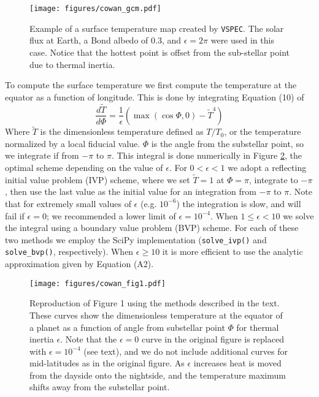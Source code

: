 \documentclass[twocolumn]{aastex631}
\newcommand{\vspec}[1]{\texttt{VSPEC}#1}
\begin{document}
\begin{figure}
    \centering
    \texttt{[image: figures/cowan\_gcm.pdf]}
    \caption{
        Example of a surface temperature map created by \vspec{}. The solar flux at Earth,
        a Bond albedo of 0.3, and $\epsilon = 2\pi$ were used in this case.
        Notice that the hottest point is offset from the sub-stellar point due to thermal inertia.
    }
    \label{fig:thermal_inertia}
\end{figure}

To compute the surface temperature we first compute the temperature at the equator as a function of longitude. This is done by integrating Equation (10) of \citet{cowan2011}
\begin{equation}
    \frac{d \tilde{T}}{d \Phi} = \frac{1}{\epsilon}(\max{(\cos{\Phi}, 0)} - \tilde{T}^4)
\end{equation}
Where $\tilde{T}$ is the dimensionless temperature defined as $T/T_0$, or the temperature normalized by a local fiducial value. $\Phi$ is the angle from the substellar point, so we integrate if from $-\pi$ to $\pi$. This integral is done numerically in Figure \ref{fig:cowan_curves}, the optimal scheme depending on the value of $\epsilon$. For $0 < \epsilon < 1$ we adopt a reflecting initial value problem (IVP) scheme, where we set $\tilde{T}=1$ at $\Phi=\pi$, integrate to $-\pi$, then use the last value as the initial value for an integration from $-\pi$ to $\pi$. Note that for extremely small values of $\epsilon$ (e.g. $10^{-6}$) the integration is slow, and will fail if $\epsilon=0$; we recommended a lower limit of $\epsilon=10^{-4}$. When $1\le \epsilon < 10$ we solve the integral using a boundary value problem (BVP) scheme. For each of these two methods we employ the SciPy implementation (\texttt{solve\_ivp()} and \texttt{solve\_bvp()}, respectively). When $\epsilon \ge 10$ it is more efficient to use the analytic approximation given by \citet{cowan2011} Equation (A2).

\begin{figure}
    \centering
    \texttt{[image: figures/cowan\_fig1.pdf]}
    \caption{
        Reproduction of \citet{cowan2011} Figure 1 using the methods described in the text. These curves show the dimensionless temperature at the equator of a planet as a function of angle from substellar point $\Phi$ for thermal inertia $\epsilon$. Note that the $\epsilon=0$ curve in the original figure is replaced with $\epsilon=10^{-4}$ (see text), and we do not include additional curves for mid-latitudes as in the original figure. As $\epsilon$ increases heat is moved from the dayside onto the nightside, and the temperature maximum shifts away from the substellar point.
    }
    \label{fig:cowan_curves}
\end{figure}
\end{document}
